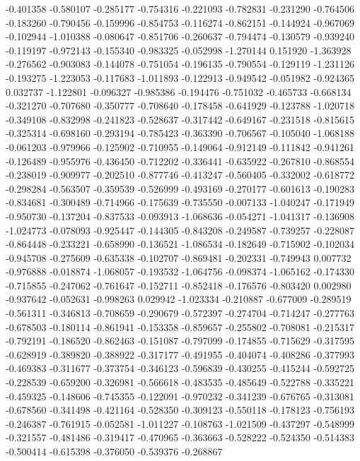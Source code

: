 -0.401358
-0.580107
-0.285177
-0.754316
-0.221093
-0.782831
-0.231290
-0.764506
-0.183260
-0.790456
-0.159996
-0.854753
-0.116274
-0.862151
-0.144924
-0.967069
-0.102944
-1.010388
-0.080647
-0.851706
-0.260637
-0.794474
-0.130579
-0.939240
-0.119197
-0.972143
-0.155340
-0.983325
-0.052998
-1.270144
0.151920
-1.363928
-0.276562
-0.903083
-0.144078
-0.751054
-0.196135
-0.790554
-0.129119
-1.231126
-0.193275
-1.223053
-0.117683
-1.011893
-0.122913
-0.949542
-0.051982
-0.924365
0.032737
-1.122801
-0.096327
-0.985386
-0.194476
-0.751032
-0.465733
-0.668134
-0.321270
-0.707680
-0.350777
-0.708640
-0.178458
-0.641929
-0.123788
-1.020718
-0.349108
-0.832998
-0.241823
-0.528637
-0.317442
-0.649167
-0.231518
-0.815615
-0.325314
-0.698160
-0.293194
-0.785423
-0.363390
-0.706567
-0.105040
-1.068188
-0.061203
-0.979966
-0.125902
-0.710955
-0.149064
-0.912149
-0.111842
-0.941261
-0.126489
-0.955976
-0.436450
-0.712202
-0.336441
-0.635922
-0.267810
-0.868554
-0.238019
-0.909977
-0.202510
-0.877746
-0.413247
-0.560405
-0.332002
-0.618772
-0.298284
-0.563507
-0.359539
-0.526999
-0.493169
-0.270177
-0.601613
-0.190283
-0.834681
-0.300489
-0.714966
-0.175639
-0.735550
-0.007133
-1.040247
-0.171949
-0.950730
-0.137204
-0.837533
-0.093913
-1.068636
-0.054271
-1.041317
-0.136908
-1.024773
-0.078093
-0.925447
-0.144305
-0.843208
-0.249587
-0.739257
-0.228087
-0.864448
-0.233221
-0.658990
-0.136521
-1.086534
-0.182649
-0.715902
-0.102034
-0.945708
-0.275609
-0.635338
-0.102707
-0.869481
-0.202331
-0.749943
0.007732
-0.976888
-0.018874
-1.068057
-0.193532
-1.064756
-0.098374
-1.065162
-0.174330
-0.715855
-0.247062
-0.761647
-0.152711
-0.852418
-0.176576
-0.803420
0.002980
-0.937642
-0.052631
-0.998263
0.029942
-1.023334
-0.210887
-0.677009
-0.289519
-0.561311
-0.346813
-0.708659
-0.290679
-0.572397
-0.274704
-0.714247
-0.277763
-0.678503
-0.180114
-0.861941
-0.153358
-0.859657
-0.255802
-0.708081
-0.215317
-0.792191
-0.186520
-0.862463
-0.151087
-0.797099
-0.174855
-0.715629
-0.317595
-0.628919
-0.389820
-0.388922
-0.317177
-0.491955
-0.404074
-0.408286
-0.377993
-0.469383
-0.311677
-0.373754
-0.346123
-0.596839
-0.430255
-0.415244
-0.592725
-0.228539
-0.659200
-0.326981
-0.566618
-0.483535
-0.485649
-0.522788
-0.335221
-0.459325
-0.148606
-0.745355
-0.122091
-0.970232
-0.341239
-0.676765
-0.313081
-0.678560
-0.341498
-0.421164
-0.528350
-0.309123
-0.550118
-0.178123
-0.756193
-0.246387
-0.761915
-0.052581
-1.011227
-0.108763
-1.021509
-0.437297
-0.548999
-0.321557
-0.481486
-0.319417
-0.470965
-0.363663
-0.528222
-0.524350
-0.514383
-0.500414
-0.615398
-0.376050
-0.539376
-0.268867
